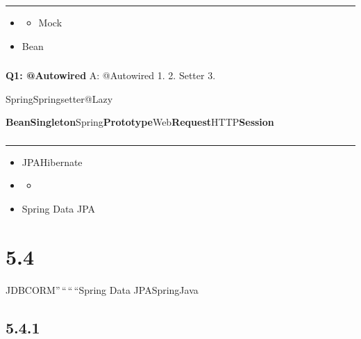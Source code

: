 \begin{center}\rule{0.5\linewidth}{0.5pt}\end{center}

\begin{itemize}
\tightlist
\item
  \begin{itemize}
  \tightlist
  \item
    Mock
  \end{itemize}
\item
  Bean
\end{itemize}

\subsubsection{}\label{section-30}

\textbf{Q1: @Autowired} A: @Autowired 1. 2. Setter 3.

SpringSpringsetter@Lazy

\textbf{BeanSingleton}Spring\textbf{Prototype}Web\textbf{Request}HTTP\textbf{Session}

\subsubsection{}\label{section-31}

\begin{center}\rule{0.5\linewidth}{0.5pt}\end{center}

\begin{itemize}
\tightlist
\item
  JPAHibernate
\item
  \begin{itemize}
  \tightlist
  \item
  \end{itemize}
\item
  Spring Data JPA
\end{itemize}

\section{5.4}\label{section-32}

JDBCORM''\,``\,``\,``Spring Data JPASpringJava

\subsection{5.4.1}\label{section-33}

